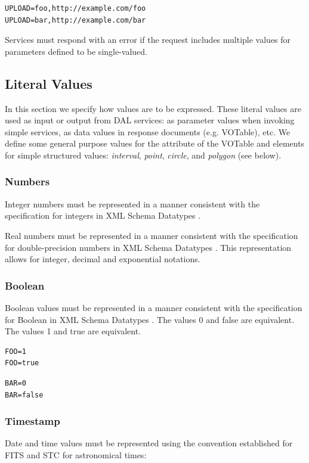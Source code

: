 \documentclass[11pt,letter]{ivoa}
\begin{document}
\begin{verbatim}
UPLOAD=foo,http://example.com/foo
UPLOAD=bar,http://example.com/bar
\end{verbatim}

Services must respond with an error if the request includes multiple values for 
parameters defined to be single-valued.

\subsection{Literal Values}
In this section we specify how values are to be expressed. These literal values 
are used as input or output from DAL services: as parameter values when 
invoking simple services, as data values in response documents (e.g. VOTable), 
etc. We define some general purpose values for the  attribute of 
the VOTable  and  elements  for simple
structured values: \emph{interval}, 
\emph{point}, \emph{circle}, and \emph{polygon} (see below).

\subsubsection{Numbers}
Integer numbers must be represented in a manner consistent with the 
specification for integers in XML Schema Datatypes \citep{std:XSD2}.

Real numbers must be represented in a manner consistent with the specification 
for double-precision numbers in XML Schema Datatypes \citep{std:XSD2}. This 
representation allows for integer, decimal and exponential notations.

\subsubsection{Boolean}
Boolean values must be represented in a manner consistent with the 
specification 
for Boolean in XML Schema Datatypes \citep{std:XSD2}. The values 0 and false 
are equivalent. The values 1 and true are equivalent.  

\begin{verbatim}
FOO=1
FOO=true
\end{verbatim}

\begin{verbatim}
BAR=0
BAR=false
\end{verbatim}

\subsubsection{Timestamp}
Date and time values must be represented  using the convention established for 
FITS \citep{std:FITS} and STC \citep{std:STC} for astronomical times:
\end{document}
